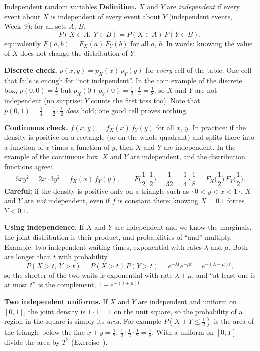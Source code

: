 \begin{key}{Independent random variables}
	\setlength{\parskip}{5pt}
	\textbf{Definition.} $X$ and $Y$ are \emph{independent} if every event
	about $X$ is independent of every event about $Y$ (independent events,
	Week~9): for all sets $A$, $B$,
	\[ P(X\in A,\ Y\in B)=P(X\in A)\,P(Y\in B), \]
	equivalently $F(a,b)=F_X(a)\,F_Y(b)$ for all $a$, $b$. In words: knowing
	the value of $X$ does not change the distribution of $Y$.

	\textbf{Discrete check.} $p(x,y)=p_X(x)\,p_Y(y)$ for \emph{every} cell of
	the table. One cell that fails is enough for ``not independent''. In the
	coin example of the discrete box,
	$p(0,0)=\frac14$ but $p_X(0)\,p_Y(0)=\frac12\cdot\frac14=\frac18$, so $X$
	and $Y$ are not independent (no surprise: $Y$ counts the first toss
	too). Note that $p(0,1)=\frac14=\frac12\cdot\frac12$ \emph{does} hold;
	one good cell proves nothing.

	\textbf{Continuous check.} $f(x,y)=f_X(x)\,f_Y(y)$ for all $x$, $y$. In
	practice: if the density is positive on a rectangle (or on the whole
	quadrant) and splits there into a function of $x$ times a function of
	$y$, then $X$ and $Y$ are independent. In the example of the continuous
	box, $X$ and $Y$ are independent, and the distribution functions agree:
	\[ 6xy^2=2x\cdot3y^2=f_X(x)\,f_Y(y),\qquad
		F\Big(\frac12,\frac12\Big)=\frac1{32}
		=\frac14\cdot\frac18=F_X\Big(\frac12\Big)\,F_Y\Big(\frac12\Big). \]
	\textbf{Careful:} if the density is positive only on a triangle such as
	$\{0<y<x<1\}$, $X$ and $Y$ are \emph{not} independent, even if $f$ is
	constant there: knowing $X=0.1$ forces $Y<0.1$.

	\textbf{Using independence.} If $X$ and $Y$ are independent and we know
	the marginals, the joint distribution is their product, and
	probabilities of ``and'' multiply. Example: two independent waiting
	times, exponential with rates $\lambda$ and $\mu$. Both are longer than
	$t$ with probability
	\[ P(X>t,\ Y>t)=P(X>t)\,P(Y>t)=e^{-\lambda t}e^{-\mu t}
		=e^{-(\lambda+\mu)t}, \]
	so the shorter of the two waits is exponential with rate $\lambda+\mu$,
	and ``at least one is at most $t$'' is the complement,
	$1-e^{-(\lambda+\mu)t}$.

	\textbf{Two independent uniforms.} If $X$ and $Y$ are independent and
	uniform on $[0,1]$, the joint density is $1\cdot1=1$ on the unit square,
	so the probability of a region in the square is simply its
	\emph{area}. For example $P(X+Y\le\frac12)$ is the area of the triangle
	below the line $x+y=\frac12$, $\frac12\cdot\frac12\cdot\frac12=\frac18$.
	With a uniform on $[0,T]$ divide the area by $T^2$
	(Exercise~).


\end{key}
